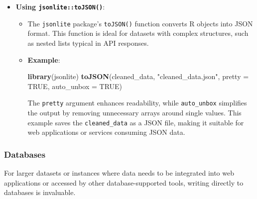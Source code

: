 \documentclass[
]{book}
\newenvironment{Shaded}{\begin{snugshade}}{\end{snugshade}}
\newcommand{\AttributeTok}[1]{\textcolor[rgb]{0.13,0.29,0.53}{#1}}
\newcommand{\ConstantTok}[1]{\textcolor[rgb]{0.56,0.35,0.01}{#1}}
\newcommand{\FunctionTok}[1]{\textcolor[rgb]{0.13,0.29,0.53}{\textbf{#1}}}
\newcommand{\NormalTok}[1]{#1}
\newcommand{\StringTok}[1]{\textcolor[rgb]{0.31,0.60,0.02}{#1}}
\providecommand{\tightlist}{%
  \setlength{\itemsep}{0pt}\setlength{\parskip}{0pt}}
\begin{document}
\begin{itemize}
\tightlist
\item
  \textbf{Using \texttt{jsonlite::toJSON()}}:

  \begin{itemize}
  \item
    The \texttt{jsonlite} package's \texttt{toJSON()} function converts R objects into JSON format. This function is ideal for datasets with complex structures, such as nested lists typical in API responses.
  \item
    \textbf{Example}:

\begin{Shaded}
\begin{Highlighting}[]
\FunctionTok{library}\NormalTok{(jsonlite)}
\FunctionTok{toJSON}\NormalTok{(cleaned\_data, }\StringTok{"cleaned\_data.json"}\NormalTok{, }\AttributeTok{pretty =} \ConstantTok{TRUE}\NormalTok{, }\AttributeTok{auto\_unbox =} \ConstantTok{TRUE}\NormalTok{)}
\end{Highlighting}
\end{Shaded}

    The \texttt{pretty} argument enhances readability, while \texttt{auto\_unbox} simplifies the output by removing unnecessary arrays around single values. This example saves the \texttt{cleaned\_data} as a JSON file, making it suitable for web applications or services consuming JSON data.
  \end{itemize}
\end{itemize}

\hypertarget{databases}{%
\subsubsection{Databases}\label{databases}}

For larger datasets or instances where data needs to be integrated into web applications or accessed by other database-supported tools, writing directly to databases is invaluable.
\end{document}
